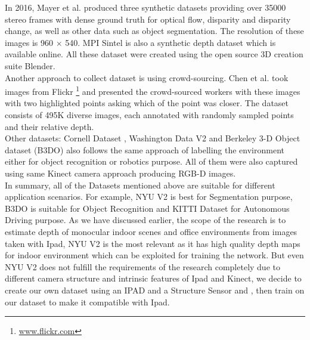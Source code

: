 In 2016, Mayer et al. \cite{MIFDB16} produced three synthetic datasets providing over 35000 stereo frames with dense ground truth for optical flow, disparity and disparity change, as well as other data such as object segmentation. The resolution of these images is 960 $\times$ 540. MPI Sintel \cite{Butler:ECCV:2012} is also a synthetic depth dataset which is available online. All these dataset were created using the open source 3D creation suite Blender.\\

Another approach to collect dataset is using crowd-sourcing. Chen et al. \cite{DBLP:journals/corr/ChenFYD16} took images from Flickr \footnote{ \url{www.flickr.com}}  and presented the crowd-sourced workers with these images with two highlighted points asking which of the point was closer. The dataset consists of 495K diverse images, each annotated with randomly sampled points and their relative depth.\\

Other datasets: Cornell Dataset \cite{3Dscene} , Washington Data V2 \cite{Washington} and  Berkeley 3-D Object dataset (B3DO) \cite{Janoch:EECS-2012-85} also follows the same approach of labelling the environment either for object recognition or robotics purpose. All of them were also captured using same Kinect camera approach producing RGB-D images.\\

In summary, all of the Datasets mentioned above are suitable for different application scenarios. For example, NYU V2 \cite{Silberman:ECCV12} is best for Segmentation purpose, B3DO \cite{Janoch:EECS-2012-85} is suitable for Object Recognition and KITTI Dataset \cite{Geiger2013IJRR} for Autonomous Driving purpose. As we have discussed earlier, the scope of the research is to estimate depth of monocular indoor scenes and office environments from  images taken with Ipad, NYU V2 is the most relevant as it has high quality depth maps for indoor environment which can be exploited for training the network. But even NYU V2 does not fulfill the requirements of the research completely due to different camera structure and intrinsic features of Ipad and Kinect, we decide to create our own dataset using an IPAD and a Structure Sensor and   , then train on our dataset to make it compatible with Ipad.






